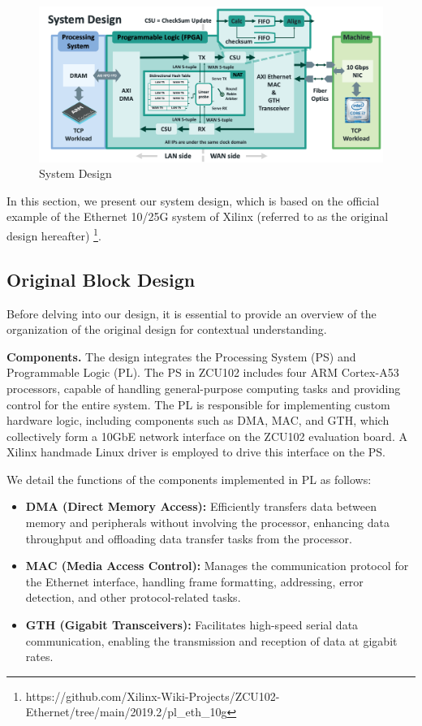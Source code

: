 \begin{figure}[ht]
    \centering
    \includegraphics[width=\linewidth]{images/design.png}
    \caption{System Design}
    \label{fig:design}
    \Description{}
\end{figure}

In this section, we present our system design, which is based on the official example of the Ethernet 10/25G system of Xilinx (referred to as the original design hereafter) \footnote{https://github.com/Xilinx-Wiki-Projects/ZCU102-Ethernet/tree/main/2019.2/pl\_eth\_10g}.

\subsection{Original Block Design}
Before delving into our design, it is essential to provide an overview of the organization of the original design for contextual understanding.

\textbf{Components.} The design integrates the Processing System (PS) and Programmable Logic (PL). The PS in ZCU102 includes four ARM Cortex-A53 processors, capable of handling general-purpose computing tasks and providing control for the entire system. The PL is responsible for implementing custom hardware logic, including components such as DMA, MAC, and GTH, which collectively form a 10GbE network interface on the ZCU102 evaluation board. A Xilinx handmade Linux driver is employed to drive this interface on the PS.

We detail the functions of the components implemented in PL as follows:

\begin{itemize}
    \item \textbf{DMA (Direct Memory Access):} Efficiently transfers data between memory and peripherals without involving the processor, enhancing data throughput and offloading data transfer tasks from the processor.
    \item \textbf{MAC (Media Access Control):} Manages the communication protocol for the Ethernet interface, handling frame formatting, addressing, error detection, and other protocol-related tasks.
    \item \textbf{GTH (Gigabit Transceivers):} Facilitates high-speed serial data communication, enabling the transmission and reception of data at gigabit rates.
\end{itemize}

